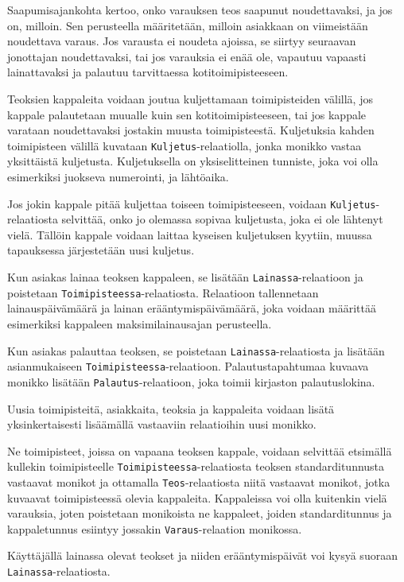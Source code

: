 \documentclass[12pt,titlepage] {article}
\begin{document}
Saapumisajankohta kertoo, onko varauksen teos saapunut noudettavaksi, ja jos on, milloin. Sen perusteella määritetään, milloin asiakkaan on viimeistään noudettava varaus. Jos varausta ei noudeta ajoissa, se siirtyy seuraavan jonottajan noudettavaksi, tai jos varauksia ei enää ole, vapautuu vapaasti lainattavaksi ja palautuu tarvittaessa kotitoimipisteeseen.

Teoksien kappaleita voidaan joutua kuljettamaan toimipisteiden välillä, jos kappale palautetaan muualle kuin sen kotitoimipisteeseen, tai jos kappale varataan noudettavaksi jostakin muusta toimipisteestä. Kuljetuksia kahden toimipisteen välillä kuvataan \texttt{Kuljetus}-relaatiolla, jonka monikko vastaa yksittäistä kuljetusta. Kuljetuksella on yksiselitteinen tunniste, joka voi olla esimerkiksi juokseva numerointi, ja lähtöaika.

Jos jokin kappale pitää kuljettaa toiseen toimipisteeseen, voidaan \texttt{Kuljetus}-relaatiosta selvittää, onko jo olemassa sopivaa kuljetusta, joka ei ole lähtenyt vielä. Tällöin kappale voidaan laittaa kyseisen kuljetuksen kyytiin, muussa tapauksessa järjestetään uusi kuljetus.

Kun asiakas lainaa teoksen kappaleen, se lisätään \texttt{Lainassa}-relaatioon ja poistetaan \texttt{Toimipisteessa}-relaatiosta. Relaatioon tallennetaan lainauspäivämäärä ja lainan erääntymispäivämäärä, joka voidaan määrittää esimerkiksi kappaleen maksimilainausajan perusteella.

Kun asiakas palauttaa teoksen, se poistetaan \texttt{Lainassa}-relaatiosta ja lisätään asianmukaiseen \texttt{Toimipisteessa}-relaatioon. Palautustapahtumaa kuvaava monikko lisätään \texttt{Palautus}-relaatioon, joka toimii kirjaston palautuslokina.

Uusia toimipisteitä, asiakkaita, teoksia ja kappaleita voidaan lisätä yksinkertaisesti lisäämällä vastaaviin relaatioihin uusi monikko.

Ne toimipisteet, joissa on vapaana teoksen kappale, voidaan selvittää etsimällä kullekin toimipisteelle \texttt{Toimipisteessa}-relaatiosta teoksen standarditunnusta vastaavat monikot ja ottamalla \texttt{Teos}-relaatiosta niitä vastaavat monikot, jotka kuvaavat toimipisteessä olevia kappaleita. Kappaleissa voi olla kuitenkin vielä varauksia, joten poistetaan monikoista ne kappaleet, joiden standarditunnus ja kappaletunnus esiintyy jossakin \texttt{Varaus}-relaation monikossa.

Käyttäjällä lainassa olevat teokset ja niiden erääntymispäivät voi kysyä suoraan \texttt{Lainassa}-relaatiosta.
\end{document}
